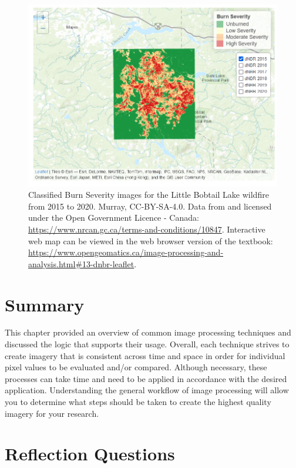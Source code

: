 \documentclass[
]{book}
\begin{document}
\begin{figure}
\includegraphics[width=0.75\linewidth]{images/13-dnbr-leaflet} \caption{Classified Burn Severity images for the Little Bobtail Lake wildfire from 2015 to 2020. Murray, CC-BY-SA-4.0. Data from \citep{natural_resources_canada_natural_nodate} and licensed under the Open Government Licence - Canada: \url{https://www.nrcan.gc.ca/terms-and-conditions/10847}. Interactive web map can be viewed in the web browser version of the textbook: \url{https://www.opengeomatics.ca/image-processing-and-analysis.html\#13-dnbr-leaflet}.}\label{fig:13-dnbr-leaflet}
\end{figure}

\section{Summary}\label{summary-4}

This chapter provided an overview of common image processing techniques and discussed the logic that supports their usage. Overall, each technique strives to create imagery that is consistent across time and space in order for individual pixel values to be evaluated and/or compared. Although necessary, these processes can take time and need to be applied in accordance with the desired application. Understanding the general workflow of image processing will allow you to determine what steps should be taken to create the highest quality imagery for your research.

\section*{Reflection Questions}\label{reflection-questions-8}
\end{document}
